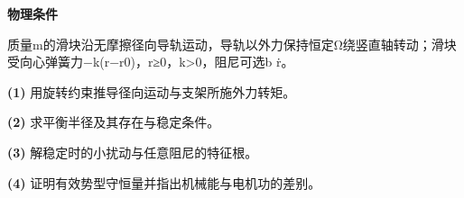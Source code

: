 \textbf{物理条件}\par 质量m的滑块沿无摩擦径向导轨运动，导轨以外力保持恒定Ω绕竖直轴转动；滑块受向心弹簧力−k(r−r0)，r≥0，k>0，阻尼可选b ṙ。
\par\noindent\textbf{(1)} 用旋转约束推导径向运动与支架所施外力转矩。
\par\noindent\textbf{(2)} 求平衡半径及其存在与稳定条件。
\par\noindent\textbf{(3)} 解稳定时的小扰动与任意阻尼的特征根。
\par\noindent\textbf{(4)} 证明有效势型守恒量并指出机械能与电机功的差别。
